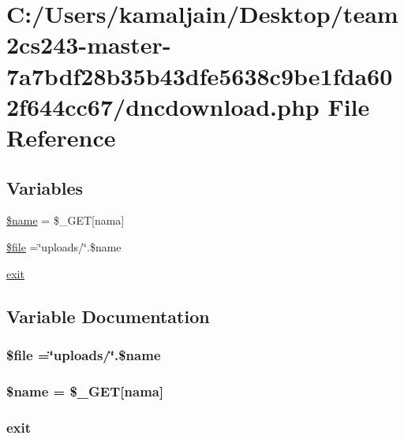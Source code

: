 \hypertarget{dncdownload_8php}{}\section{C\+:/\+Users/kamaljain/\+Desktop/team2cs243-\/master-\/7a7bdf28b35b43dfe5638c9be1fda602f644cc67/dncdownload.php File Reference}
\label{dncdownload_8php}
\subsection*{Variables}
\begin{DoxyCompactItemize}
\item 
\hyperlink{dncdownload_8php_ab2fc40d43824ea3e1ce5d86dee0d763b}{\$name} = \$\+\_\+\+G\+ET\mbox{[}\textquotesingle{}nama\textquotesingle{}\mbox{]}
\item 
\hyperlink{dncdownload_8php_aa1bfbd27060176201b271918dff57e8f}{\$file} =\char`\"{}uploads/\char`\"{}.\$name
\item 
\hyperlink{dncdownload_8php_a6733eb5f605d09eaede9845835d71c4e}{exit}
\end{DoxyCompactItemize}


\subsection{Variable Documentation}
\subsubsection[{\texorpdfstring{\$file}{$file}}]{\setlength{\rightskip}{0pt plus 5cm}\$file =\char`\"{}uploads/\char`\"{}.\$name}\hypertarget{dncdownload_8php_aa1bfbd27060176201b271918dff57e8f}{}\label{dncdownload_8php_aa1bfbd27060176201b271918dff57e8f}
\subsubsection[{\texorpdfstring{\$name}{$name}}]{\setlength{\rightskip}{0pt plus 5cm}\$name = \$\+\_\+\+G\+ET\mbox{[}\textquotesingle{}nama\textquotesingle{}\mbox{]}}\hypertarget{dncdownload_8php_ab2fc40d43824ea3e1ce5d86dee0d763b}{}\label{dncdownload_8php_ab2fc40d43824ea3e1ce5d86dee0d763b}
\subsubsection[{\texorpdfstring{exit}{exit}}]{\setlength{\rightskip}{0pt plus 5cm}exit}\hypertarget{dncdownload_8php_a6733eb5f605d09eaede9845835d71c4e}{}\label{dncdownload_8php_a6733eb5f605d09eaede9845835d71c4e}
